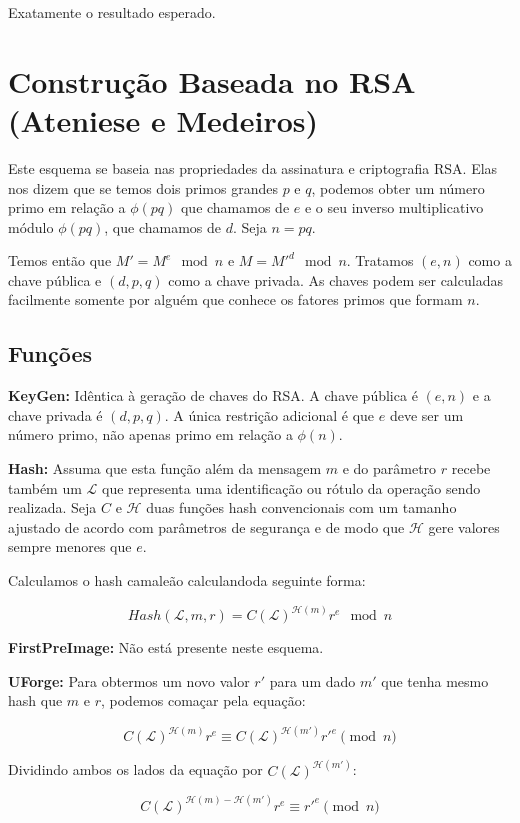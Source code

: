 \documentclass[a4paper]{article}
\begin{document}
Exatamente o resultado esperado.

\section{Construção Baseada no RSA (Ateniese e Medeiros) \cite{ateniese}}

Este esquema se baseia nas propriedades da assinatura e criptografia
RSA. Elas nos dizem que se temos dois primos grandes $p$ e $q$,
podemos obter um número primo em relação a $\phi(pq)$ que chamamos de
$e$ e o seu inverso multiplicativo módulo $\phi(pq)$, que chamamos de
$d$. Seja $n=pq$.

Temos então que $M'=M^e \mod n$ e $M=M'^d \mod n$. Tratamos $(e, n)$
como a chave pública e $(d, p, q)$ como a chave privada. As chaves
podem ser calculadas facilmente somente por alguém que conhece os
fatores primos que formam $n$.

\subsection{Funções}

\textbf{KeyGen: } Idêntica à geração de chaves do RSA. A chave pública
é $(e, n)$ e a chave privada é $(d, p, q)$. A única restrição
adicional é que $e$ deve ser um número primo, não apenas primo em
relação a $\phi(n)$.

\textbf{Hash: } Assuma que esta função além da mensagem $m$ e do
parâmetro $r$ recebe também um $\mathcal{L}$ que representa uma
identificação ou rótulo da operação sendo realizada. Seja $C$ e
$\mathcal{H}$ duas funções hash convencionais com um tamanho ajustado
de acordo com parâmetros de segurança e de modo que $\mathcal{H}$ gere
valores sempre menores que $e$.

Calculamos o hash camaleão calculandoda seguinte forma:

$$
Hash(\mathcal{L}, m, r) = C(\mathcal{L})^{\mathcal{H}(m)}r^e \mod n
$$

\textbf{FirstPreImage:} Não está presente neste esquema.

\textbf{UForge:} Para obtermos um novo valor $r'$ para um dado $m'$
que tenha mesmo hash que $m$ e $r$, podemos comaçar pela equação:

$$
C(\mathcal{L})^{\mathcal{H}(m)}r^e \equiv C(\mathcal{L})^{\mathcal{H}(m')}r'^e \pmod n
$$

Dividindo ambos os lados da equação por $C(\mathcal{L})^{\mathcal{H}(m')}$:

$$
C(\mathcal{L})^{\mathcal{H}(m)-\mathcal{H}(m')}r^e \equiv r'^e \pmod n
$$
\end{document}
